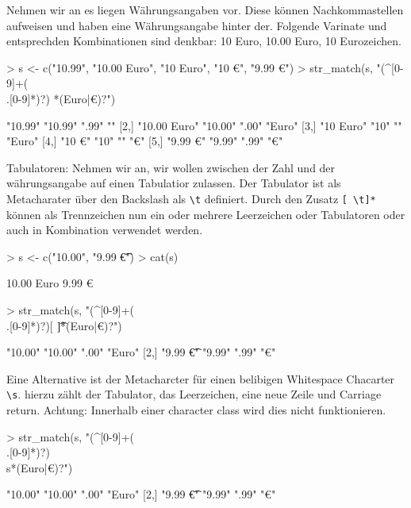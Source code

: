 \documentclass[a4paper]{report}
\begin{document}
Nehmen wir an es liegen Währungsangaben vor. Diese können Nachkommastellen aufweisen und haben eine Währungsangabe hinter der. Folgende Varinate und entsprechden Kombinationen sind denkbar: 10 Euro, 10.00 Euro, 10 Eurozeichen.

\begin{Schunk}
\begin{Sinput}
> s <- c("10.99", "10.00 Euro", "10  Euro", "10 €", "9.99 €")
> str_match(s, "(^[0-9]+(\\.[0-9]*)?) *(Euro|€)?")
\end{Sinput}
\begin{Soutput}
     [,1]         [,2]    [,3]  [,4]  
[1,] "10.99"      "10.99" ".99" ""    
[2,] "10.00 Euro" "10.00" ".00" "Euro"
[3,] "10  Euro"   "10"    ""    "Euro"
[4,] "10 €"       "10"    ""    "€"   
[5,] "9.99 €"     "9.99"  ".99" "€"   
\end{Soutput}
\end{Schunk}

Tabulatoren: Nehmen wir an, wir wollen zwischen der Zahl und der währungsangabe auf einen Tabulatior zulassen. Der Tabulator ist als Metacharater über den Backslash als \verb!\t! definiert. Durch den Zusatz \verb![ \t]*! können als Trennzeichen nun ein oder mehrere Leerzeichen oder Tabulatoren oder auch in Kombination verwendet werden. 

\begin{Schunk}
\begin{Sinput}
> s <- c("10.00\tEuro", "9.99 \t€")
> cat(s) 
\end{Sinput}
\begin{Soutput}
10.00	Euro 9.99 	€
\end{Soutput}
\begin{Sinput}
> str_match(s, "(^[0-9]+(\\.[0-9]*)?)[ \t]*(Euro|€)?")
\end{Sinput}
\begin{Soutput}
     [,1]          [,2]    [,3]  [,4]  
[1,] "10.00\tEuro" "10.00" ".00" "Euro"
[2,] "9.99 \t€"    "9.99"  ".99" "€"   
\end{Soutput}
\end{Schunk}

Eine Alternative ist der Metacharcter für einen belibigen Whitespace Chacarter \verb!\s!. hierzu zählt der Tabulator, das Leerzeichen, eine neue Zeile und Carriage return. Achtung: Innerhalb einer character class wird dies nicht funktionieren.

\begin{Schunk}
\begin{Sinput}
> str_match(s, "(^[0-9]+(\\.[0-9]*)?)\\s*(Euro|€)?")
\end{Sinput}
\begin{Soutput}
     [,1]          [,2]    [,3]  [,4]  
[1,] "10.00\tEuro" "10.00" ".00" "Euro"
[2,] "9.99 \t€"    "9.99"  ".99" "€"   
\end{Soutput}
\end{Schunk}
\end{document}
